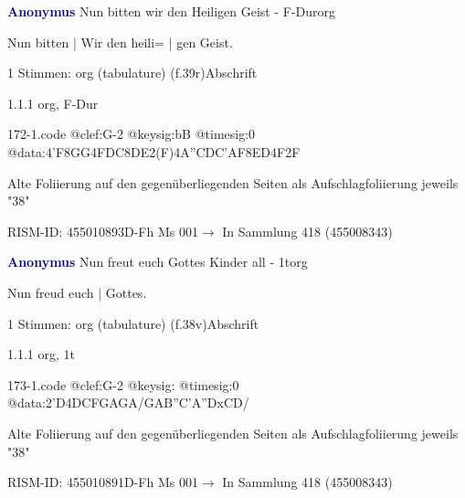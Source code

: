 \documentclass[twocolumn, 12pt]{book}
\begin{document}
\par \vspace{16pt} \textcolor{darkblue}{\textbf{Anonymus  }}\hfillplus{\textbf{[172]}}\newline Nun bitten wir den Heiligen Geist - F-Dur\newline org
\par \begin{itshape}[f.39r, at left:] Nun bitten | Wir den heili= | gen Geist.\end{itshape} 
\par \textcolor{darkblue}{}  1 Stimmen: org (tabulature)  (f.39r)\newline Abschrift
\par 1.1.1  org, F-Dur  
\begin{filecontents*}{172-1.code}
@clef:G-2
@keysig:bB
@timesig:0
@data:4'F{8GG}4FDC{8DE}2(F)4A''CDC'AF{8ED}4F2F
\end{filecontents*}
\newline %
\par Alte Foliierung auf den gegenüberliegenden Seiten als Aufschlagfoliierung jeweils "38"
\par RISM-ID: 455010893\newline D-Fh  Ms 001\newline $\rightarrow$ In Sammlung 418 (455008343)
      
\par \vspace{16pt} \textcolor{darkblue}{\textbf{Anonymus  }}\hfillplus{\textbf{[173]}}\newline Nun freut euch Gottes Kinder all - 1t\newline org
\par \begin{itshape}[f.38v, at left:] Nun freud euch | Gottes.\end{itshape} 
\par \textcolor{darkblue}{}  1 Stimmen: org (tabulature)  (f.38v)\newline Abschrift
\par 1.1.1  org, 1t  
\begin{filecontents*}{173-1.code}
@clef:G-2
@keysig:
@timesig:0
@data:2'D4DCFGAGA/GAB''C'A''DxCD/
\end{filecontents*}
\newline %
\par Alte Foliierung auf den gegenüberliegenden Seiten als Aufschlagfoliierung jeweils "38"
\par RISM-ID: 455010891\newline D-Fh  Ms 001\newline $\rightarrow$ In Sammlung 418 (455008343)
      
\end{document}
